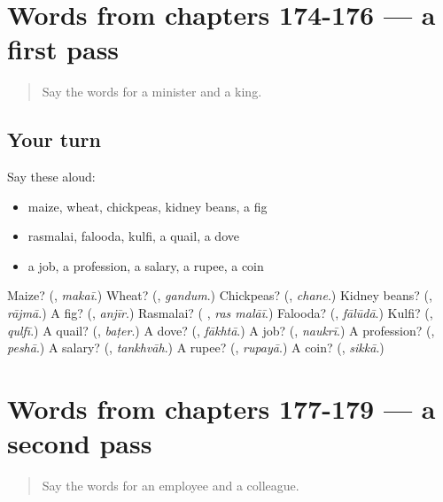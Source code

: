 \section[(dialogue)]{Words from chapters 174-176 — a first pass}

\label{lesson:UR-R179-first-pass-words-from-chapters-174-176}



\begin{quote}
Say the words for a minister and a king.
\end{quote}

\subsection*{Your turn}
Say these aloud:

\begin{itemize}
\raggedright
  \item maize, wheat, chickpeas, kidney beans, a fig
  \item rasmalai, falooda, kulfi, a quail, a dove
  \item a job, a profession, a salary, a rupee, a coin
\end{itemize}

\begin{tcolorbox}[breakable,colback=teal!4,colframe=teal!35!black,title={Before you move on}]
Maize? (\textbf{}, \emph{makaī}.) Wheat? (\textbf{}, \emph{gandum}.) Chickpeas? (\textbf{}, \emph{chane}.) Kidney beans? (\textbf{}, \emph{rājmā}.) A fig? (\textbf{}, \emph{anjīr}.) Rasmalai? (\textbf{ }, \emph{ras malāī}.) Falooda? (\textbf{}, \emph{fālūdā}.) Kulfi? (\textbf{}, \emph{qulfī}.) A quail? (\textbf{}, \emph{baṭer}.) A dove? (\textbf{}, \emph{fākhtā}.) A job? (\textbf{}, \emph{naukrī}.) A profession? (\textbf{}, \emph{peshā}.) A salary? (\textbf{}, \emph{tankhvāh}.) A rupee? (\textbf{}, \emph{rupayā}.) A coin? (\textbf{}, \emph{sikkā}.)
\end{tcolorbox}
\section[(dialogue)]{Words from chapters 177-179 — a second pass}

\label{lesson:UR-R179-second-pass-words-from-chapters-177-179}



\begin{quote}
Say the words for an employee and a colleague.
\end{quote}

